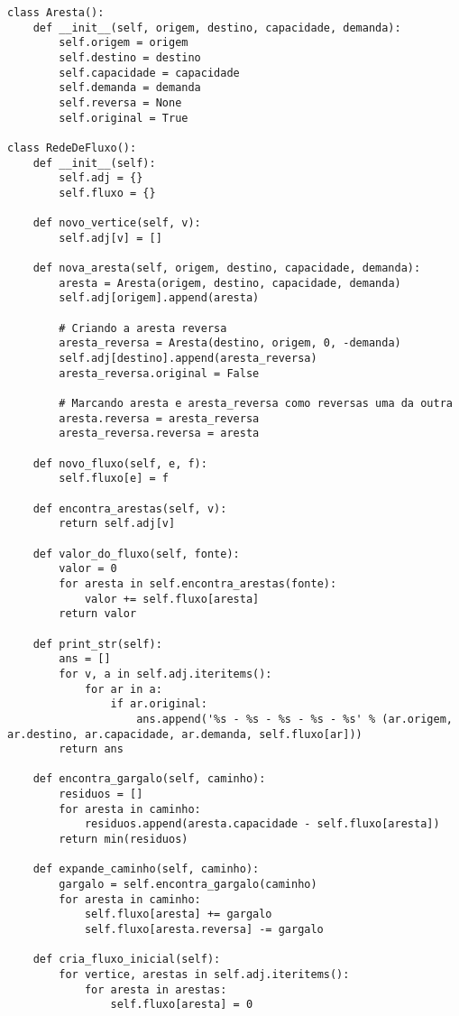 \documentclass[11pt]{article}
\begin{document}
\begin{verbatim}
class Aresta():
    def __init__(self, origem, destino, capacidade, demanda):
        self.origem = origem
        self.destino = destino
        self.capacidade = capacidade
        self.demanda = demanda
        self.reversa = None
        self.original = True

class RedeDeFluxo():
    def __init__(self):
        self.adj = {}
        self.fluxo = {}

    def novo_vertice(self, v):
        self.adj[v] = []

    def nova_aresta(self, origem, destino, capacidade, demanda):
        aresta = Aresta(origem, destino, capacidade, demanda)
        self.adj[origem].append(aresta)

        # Criando a aresta reversa
        aresta_reversa = Aresta(destino, origem, 0, -demanda)
        self.adj[destino].append(aresta_reversa)
        aresta_reversa.original = False

        # Marcando aresta e aresta_reversa como reversas uma da outra
        aresta.reversa = aresta_reversa
        aresta_reversa.reversa = aresta

    def novo_fluxo(self, e, f):
        self.fluxo[e] = f

    def encontra_arestas(self, v):
        return self.adj[v]

    def valor_do_fluxo(self, fonte):
        valor = 0
        for aresta in self.encontra_arestas(fonte):
            valor += self.fluxo[aresta]
        return valor

    def print_str(self):
        ans = []
        for v, a in self.adj.iteritems():
            for ar in a:
                if ar.original:
                    ans.append('%s - %s - %s - %s - %s' % (ar.origem, ar.destino, ar.capacidade, ar.demanda, self.fluxo[ar]))
        return ans

    def encontra_gargalo(self, caminho):
        residuos = []
        for aresta in caminho:
            residuos.append(aresta.capacidade - self.fluxo[aresta])
        return min(residuos)

    def expande_caminho(self, caminho):
        gargalo = self.encontra_gargalo(caminho)
        for aresta in caminho:
            self.fluxo[aresta] += gargalo
            self.fluxo[aresta.reversa] -= gargalo

    def cria_fluxo_inicial(self):
        for vertice, arestas in self.adj.iteritems():
            for aresta in arestas:
                self.fluxo[aresta] = 0


\end{verbatim}
\end{document}
